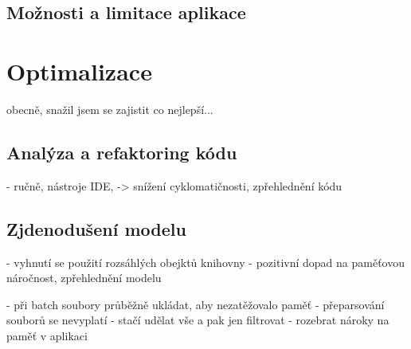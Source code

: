 	   \subsection{Možnosti a limitace aplikace}
	   




\section{Optimalizace}

	obecně, snažil jsem se zajistit co nejlepší...

 \subsection{Analýza a refaktoring kódu}
  	- ručně, nástroje IDE, -> snížení cyklomatičnosti, zpřehlednění kódu
  	
 \subsection{Zjdenodušení modelu} 
 	- vyhnutí se použití rozsáhlých obejktů knihovny
 	- pozitivní dopad na paměťovou náročnost, zpřehlednění modelu

 - při batch soubory průběžně ukládat, aby nezatěžovalo paměť
 - přeparsování souborů se nevyplatí - stačí udělat vše a pak jen filtrovat 
 - rozebrat nároky na paměť v aplikaci
